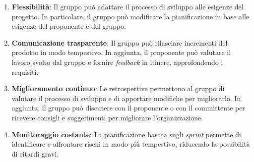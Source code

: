 \begin{enumerate}
	\item \textbf{Flessibilità}: Il gruppo può adattare il processo di sviluppo
	      alle esigenze del progetto. In particolare, il gruppo
	      può modificare la pianificazione in base alle esigenze del
	      proponente e del gruppo.

	\item \textbf{Comunicazione trasparente}: Il gruppo può rilasciare
	      incrementi del prodotto in modo tempestivo. In aggiunta, il
	      proponente può valutare il lavoro svolto dal gruppo e fornire
	      \textit{feedback} in itinere, approfondendo i requisiti.

	\item \textbf{Miglioramento continuo}: Le retrospettive permettono al
	      gruppo di valutare il processo di sviluppo e di apportare
	      modifiche per migliorarlo. In aggiunta, il gruppo può
	      discutere con il proponente o con il committente per ricevere consigli
	      e suggerimenti per migliorare l'organizzazione.

	\item \textbf{Monitoraggio costante}: La pianificazione basata sugli
	      \textit{sprint} permette di identificare e affrontare rischi in modo
	      più tempestivo, riducendo la possibilità di ritardi gravi.
\end{enumerate}
